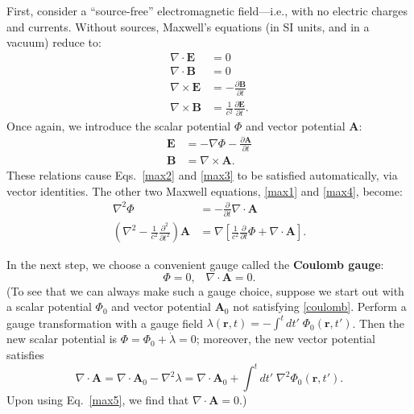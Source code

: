 \documentclass[pra,12pt]{revtex4}
\begin{document}
First, consider a ``source-free'' electromagnetic field---i.e., with
no electric charges and currents.  Without sources, Maxwell's
equations (in SI units, and in a vacuum) reduce to:
\begin{align}
  \nabla\cdot \mathbf{E} &= 0 \label{max1} \\
  \nabla\cdot \mathbf{B} &= 0 \label{max2}\\
  \nabla\times \mathbf{E} &= -\frac{\partial \mathbf{B}}{\partial t} \label{max3}\\
  \nabla\times \mathbf{B} &= \frac{1}{c^2} \frac{\partial \mathbf{E}}{\partial t}.
  \label{max4}
\end{align}
Once again, we introduce the scalar potential $\Phi$ and vector
potential $\mathbf{A}$:
\begin{align}
  \mathbf{E} &= - \nabla \Phi - \frac{\partial\mathbf{A}}{\partial t} \\
  \mathbf{B} &= \nabla \times \mathbf{A}.
  \label{Bfield}
\end{align}
These relations cause Eqs.~\eqref{max2} and \eqref{max3} to be
satisfied automatically, via vector identities.  The other two Maxwell
equations, \eqref{max1} and \eqref{max4}, become:
\begin{align}
  \nabla^2 \Phi &= -\frac{\partial}{\partial t} \nabla \cdot \mathbf{A} \label{max5} \\
  \left(\nabla^2 - \frac{1}{c^2}\frac{\partial^2}{\partial t^2}\right)
  \mathbf{A} &= \nabla\left[\frac{1}{c^2}\frac{\partial}{\partial t}  \Phi + \nabla\cdot\mathbf{A}\right]. \label{max6}
\end{align}

In the next step, we choose a convenient gauge called the
\textbf{Coulomb gauge}:
\begin{equation}
  \Phi = 0, \;\;\; \nabla \cdot \mathbf{A} = 0.
  \label{coulomb}
\end{equation}
(To see that we can always make such a gauge choice, suppose we start
out with a scalar potential $\Phi_0$ and vector potential
$\mathbf{A}_0$ not satisfying \eqref{coulomb}.  Perform a gauge
transformation with a gauge field $\lambda(\mathbf{r}, t) = - \int^t
dt'\; \Phi_0(\mathbf{r}, t')$.  Then the new scalar potential is $\Phi
= \Phi_0 + \dot{\lambda} = 0$; moreover, the new vector potential
satisfies
\begin{equation}
  \nabla\cdot\mathbf{A} = \nabla\cdot \mathbf{A}_0 - \nabla^2 \lambda
  = \nabla\cdot \mathbf{A}_0 + \int^t dt'\; \nabla^2\Phi_0(\mathbf{r}, t').
\end{equation}
Upon using Eq.~\eqref{max5}, we find that $\nabla\cdot\mathbf{A} =
0$.)
\end{document}
